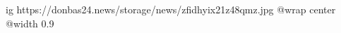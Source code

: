  
 
 
 
 

\ifcmt
  ig https://donbas24.news/storage/news/zfidhyix21z48qmz.jpg
  @wrap center
  @width 0.9
\fi
